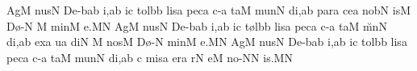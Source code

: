{{{\bigskip
{}
\Internote
\nosolesmescustos
\initiumgregorianum
\sgn {}Ag\punctum M\egn
\sgn nus\punctum N\egn
\spatium
\sgn D{e}-\bmolle b\pes ab\egn
\sgn {}i,\punctum a\augmentum b\egn
\spatium
\divisiominima\spatium
{}i{}\punctum c\egn
\spatium
\sgn t{o}l\bmolle b\punctum b\egn
\sgn lis\punctum a\egn
\spatium
\sgn pec\punctum a\egn
\sgn c{\a}-\punctum a\egn
\sgn ta{}\punctum M\egn
\spatium
\sgn m{u}n\punctum N\egn
\sgn di,\punctum a\augmentum b\egn
\spatium
\divisiomaior\spatium
\sgn p{a}r\punctum a\egn
\sgn ce{}\punctum a\egn
\spatium
\sgn n{o}b\punctum N\egn
\sgn {}is\punctum M\egn
\spatium
\sgn D{\o}-\punctum N\egn
\custos M\lineaproxima
\sgn min\punctum M\egn
\sgn {}e.\punctum M\augmentum N\egn
\spatium
\divisiofinalis\spatium
\sgn {}Ag\punctum M\egn
\sgn nus\punctum N\egn
\spatium
\sgn D{e}-\bmolle b\pes ab\egn
\sgn {}i,\punctum a\augmentum b\egn
\spatium
\divisiominima\spatium
{}i{}\punctum c\egn
\spatium
\sgn t{\o}l\bmolle b\punctum b\egn
\sgn lis\punctum a\egn
\spatium
\sgn pec\punctum a\egn
\sgn c{\a}-\punctum a\egn
\sgn ta{}\punctum M\egn
\spatium
\sgn m{\u}n\punctum N\egn
\sgn di,\punctum a\augmentum b\egn
\spatium
\divisiomaior\spatium
\sgn {}ex\punctum a\egn
\sgn {}{\a}u\punctum a\egn
\sgn di{}\punctum N\egn
\spatium
\custos M\lineaproxima
\sgn nos\punctum M\egn
\spatium
\sgn D{\o}-\punctum N\egn
\sgn min\punctum M\egn
\sgn {}e.\punctum M\augmentum N\egn
\spatium
\divisiofinalis\spatium
\sgn {}Ag\punctum M\egn
\sgn nus\punctum N\egn
\spatium
\sgn D{e}-\bmolle b\pes ab\egn
\sgn {}i,\punctum a\augmentum b\egn
\spatium
\divisiominima\spatium
{}i{}\punctum c\egn
\spatium
\sgn t{o}l\bmolle b\punctum b\egn
\sgn lis\punctum a\egn
\spatium
\sgn pec\punctum a\egn
\sgn c{\a}-\punctum a\egn
\sgn ta{}\punctum M\egn
\spatium
\sgn m{u}n\punctum N\egn
\sgn di,\punctum a\augmentum b\egn
\spatium
\divisiomaior\spatium
\custos c\lineaproxima
\sgn mis\punctum a\egn
\sgn {}er\punctum a\egn
\sgn {}{\e}r\punctum N\egn
\sgn {}e{}\punctum M\egn
\spatium
\sgn n{o}-\punctum N\augmentum N\egn
{}i{s.}\punctum M\augmentum N\egn
\spatium
\Finisgregoriana

\bigskip

}}}
